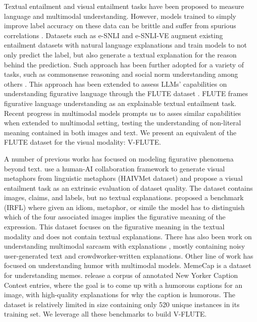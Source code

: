 Textual entailment \cite{maccartney-manning-2008-modeling, bowman-etal-2015-large} and visual entailment \cite{Xie2019VisualEA} tasks have been proposed to measure language and multimodal understanding.
However, models trained to simply improve label accuracy on these data can be brittle and suffer from spurious correlations \cite{poliak-etal-2018-hypothesis, gururangan-etal-2018-annotation, mccoy-etal-2019-right, gardner-etal-2021-competency}.
Datasets such as e-SNLI \cite{eSNLI} and e-SNLI-VE \cite{kayser2021vil} augment existing entailment datasets with natural language explanations and train models to not only predict the label, but also generate a textual explanation for the reason behind the prediction. 
Such approach has been further adopted for a variety of tasks, such as commonsense reasoning \cite{rajani-etal-2019-explain, aggarwal-etal-2021-explanations} and social norm understanding \cite{ch-wang-etal-2023-sociocultural} among others \cite{exNLPsurvey}.
This approach has been extended to assess LLMs' capabilities on understanding figurative language through the FLUTE dataset \cite{chakrabarty-etal-2022-flute}. FLUTE frames figurative language understanding as an explainable textual entailment task.
Recent progress in multimodal models \cite{ li2022blip, alayrac2022flamingo, gpt4v, team2023gemini, visInstrTune, claude3} prompts us to asses similar capabilities when extended to multimodal setting, testing the understanding of non-literal meaning contained in both images and text. 
We present an equivalent of the FLUTE dataset for the visual modality: V-FLUTE.

A number of previous works has focused on modeling figurative phenomena beyond text. \citet{chakrabarty-etal-2023-spy} use a human-AI collaboration framework to generate visual metaphors from linguistic metaphors (HAIVMet dataset) and propose
a visual entailment task as an extrinsic evaluation of dataset quality. The dataset contains images, claims, and labels, but no textual explanations. \citet{yosef-etal-2023-irfl} proposed a benchmark (IRFL) where given an idiom, metaphor, or simile the model has to distinguish which of the four associated images implies the figurative meaning of the expression. This dataset focuses on the figurative meaning in the textual modality and does not contain textual explanations. There has also been work on understanding multimodal sarcasm with explanations \cite{desai2022nice}, mostly containing  noisy user-generated text and crowdworker-written explanations. Other line of work has focused on understanding humor with multimodal models. MemeCap \cite{hwang-shwartz-2023-memecap} is a dataset for understanding memes.
\citet{hessel-etal-2023-androids} release a corpus of annotated New Yorker Caption Contest entries, where the goal is to come up with a humorous captions for an image, with high-quality explanations for why the caption is humorous. The dataset is relatively limited in size containing only 520 unique instances in its training set. We leverage all these benchmarks to build V-FLUTE. 

